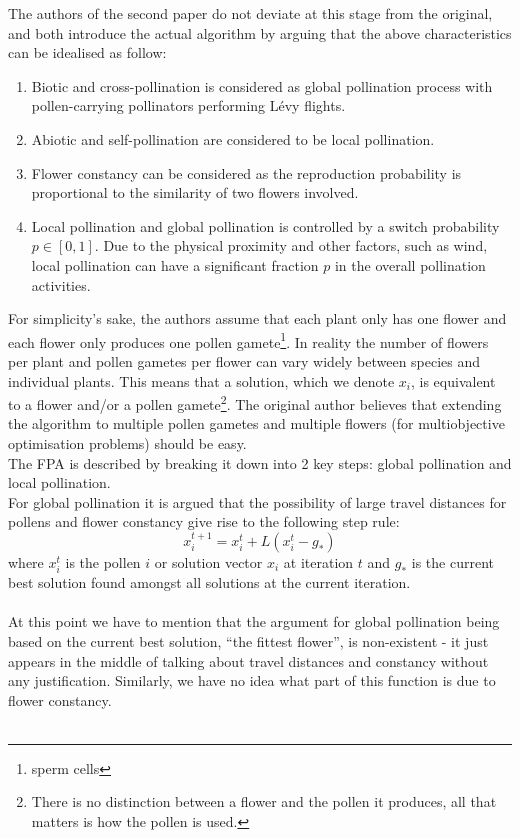 The authors of the second paper do not deviate at this stage from the original, and both introduce the actual algorithm by arguing that the above characteristics can be idealised as follow:
\begin{enumerate}[1.]
\item Biotic and cross-pollination is considered as global pollination process with pollen-carrying pollinators performing L\'evy flights.
\item Abiotic and self-pollination are considered to be local pollination.
\item Flower constancy can be considered as the reproduction probability is proportional to the similarity of two flowers involved.
\item Local pollination and global pollination is controlled by a switch probability $p \in [0,1]$. Due to the physical proximity and other factors, such as wind, local pollination can have a significant fraction $p$ in the overall pollination activities.
\end{enumerate}
For simplicity's sake, the authors assume that each plant only has one flower and each flower only produces one pollen gamete\footnote{sperm cells}. In reality the number of flowers per plant and pollen gametes per flower can vary widely between species and individual plants. This means that a solution, which we denote $x_i$, is equivalent to a flower and/or a pollen gamete\footnote{There is no distinction between a flower and the pollen it produces, all that matters is how the pollen is used.}. The original author believes that extending the algorithm to multiple pollen gametes and multiple flowers (for multiobjective optimisation problems) should be easy.\\
The FPA is described by breaking it down into 2 key steps: global pollination and local pollination.\\
For global pollination it is argued that the possibility of large travel distances for pollens and flower constancy give rise to the following step rule:
\begin{equation}
x_i^{t+1} = x_i^{t} + L(x_i^{t} - g_*)
\end{equation}
where $x_i^{t}$ is the pollen $i$ or solution vector $x_i$ at iteration $t$ and $g_*$ is the current best solution found amongst all solutions at the current iteration. 
\\~\\
At this point we have to mention that the argument for global pollination being based on the current best solution, ``the fittest flower'', is non-existent - it just appears in the middle of talking about travel distances and constancy without any justification. Similarly, we have no idea what part of this function is due to flower constancy.
\\~\\

